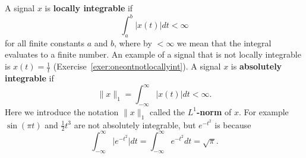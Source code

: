\documentclass[11pt,a4paper]{book}
\theoremstyle{plain}
\numberwithin{equation}{section}
\newcommand{\reals}{{\mathbb R}}
\newcommand{\ints}{{\mathbb Z}}
\newcommand{\complex}{{\mathbb C}}
\newcommand{\term}{\textbf}
\newcommand{\abs}[1]{\left\vert #1 \right\vert}
\newcommand{\sabs}[1]{\vert #1 \vert}
\begin{document}
A signal $x$ is \term{locally integrable} if
\[
\int_{a}^{b} \abs{x(t)} dt < \infty
\]
for all finite constants $a$ and $b$, where by $< \infty$ we mean that the integral evaluates to a finite number.  
An example of a signal that is not locally integrable is $x(t) = \frac{1}{t}$ (Exercise~\ref{exer:oneontnotlocallyint}).  %
A signal $x$ is \term{absolutely integrable} if
\begin{equation}\label{eq:l1normdefncontinuous}
\|x\|_1 = \int_{-\infty}^{\infty} \abs{x(t)} dt < \infty.
\end{equation}
Here we introduce the notation $\|x\|_1$ called the \term{$L^1$-norm} of $x$.  For example $\sin( \pi t)$ and $\tfrac{1}{2}t^3$ are not absolutely integrable, but $e^{-t^2}$ is because~\citep{nicholas_1950_erf}
\begin{equation}\label{eq:expabssum}
\int_{-\infty}^{\infty} \sabs{e^{-t^2}} dt = \int_{-\infty}^{\infty} e^{-t^2} dt  = \sqrt{\pi}.
\end{equation}
\end{document}
